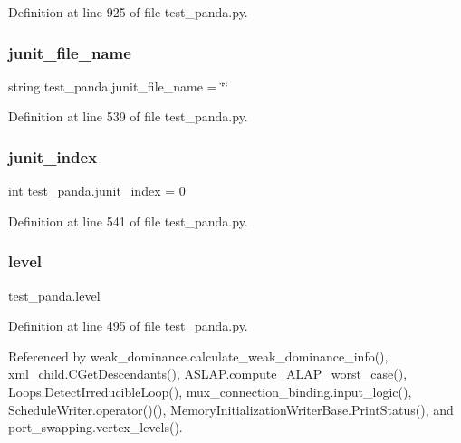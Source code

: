 Definition at line 925 of file test\+\_\+panda.\+py.

\mbox{\label{namespacetest__panda_aa375f80f1bb5f774d7bcfd9d4ded3f5c}} 
\subsubsection{\texorpdfstring{junit\+\_\+file\+\_\+name}{junit\_file\_name}}
{\footnotesize\ttfamily string test\+\_\+panda.\+junit\+\_\+file\+\_\+name = \char`\"{}\char`\"{}}



Definition at line 539 of file test\+\_\+panda.\+py.

\mbox{\label{namespacetest__panda_a93326ecb2c8f4fec6e8aeb524f189803}} 
\subsubsection{\texorpdfstring{junit\+\_\+index}{junit\_index}}
{\footnotesize\ttfamily int test\+\_\+panda.\+junit\+\_\+index = 0}



Definition at line 541 of file test\+\_\+panda.\+py.

\mbox{\label{namespacetest__panda_a1b2d6c88abc84e07978e8c994c6d91cf}} 
\subsubsection{\texorpdfstring{level}{level}}
{\footnotesize\ttfamily test\+\_\+panda.\+level}



Definition at line 495 of file test\+\_\+panda.\+py.



Referenced by weak\+\_\+dominance.\+calculate\+\_\+weak\+\_\+dominance\+\_\+info(), xml\+\_\+child.\+C\+Get\+Descendants(), A\+S\+L\+A\+P.\+compute\+\_\+\+A\+L\+A\+P\+\_\+worst\+\_\+case(), Loops.\+Detect\+Irreducible\+Loop(), mux\+\_\+connection\+\_\+binding.\+input\+\_\+logic(), Schedule\+Writer.\+operator()(), Memory\+Initialization\+Writer\+Base.\+Print\+Status(), and port\+\_\+swapping.\+vertex\+\_\+levels().

